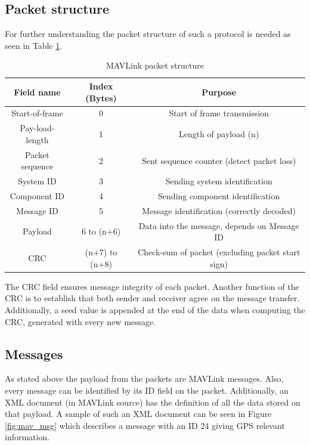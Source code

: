 \subsection{Packet structure}
For further understanding the packet structure of such a protocol is needed as seen in Table \ref{tab:mavlink}.

\begin{table}[h]
	\centering
	\begin{tabular}{|c||c|c|}
		\hline
		Field name       & Index (Bytes)  & Purpose											     \\ \hline\hline
		Start-of-frame   &      0         & Start of frame transmission 							   \\ \hline
		Pay-load-length  &      1         & Length of payload (n)       							   \\ \hline
		Packet sequence  &      2    	  & Sent sequence counter (detect packet loss)                 \\ \hline
		System ID        & 		3		  & Sending system identification 							   \\ \hline
		Component ID     & 		4 		  & Sending component identification 						   \\ \hline
		Message ID       & 		5 		  & Message identification (correctly decoded)      		   \\ \hline
		Payload          &   6 to (n+6)   & Data into the message, depends on Message ID        	   \\ \hline
		CRC              & (n+7) to (n+8) & Check-sum of packet (excluding packet start sign)          \\ \hline
	\end{tabular}
	\caption{MAVLink packet structure}
	\label{tab:mavlink}
\end{table}

The CRC field ensures message integrity of each packet. Another function of the CRC is to establish that both sender and receiver agree on the message transfer. Additionally, a seed value is appended at the end of the data when computing the CRC, generated with every new message.

\subsection{Messages}
As stated above the payload from the packets are MAVLink messages. Also, every message can be identified by its ID field on the packet. Additionally, an XML document (in MAVLink source) has the definition of all the data stored on that payload. A sample of such an XML document can be seen in Figure \ref{fig:mav_msg} which describes a message with an ID 24 giving GPS relevant information.

